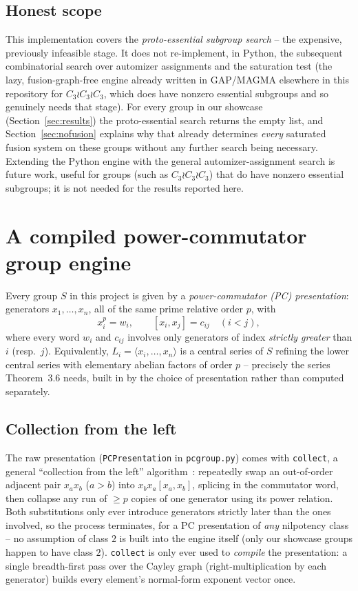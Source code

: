 \documentclass[11pt]{article}
\theoremstyle{remark}
\begin{document}
\subsection{Honest scope}
\label{sec:scope}

This implementation covers the \emph{proto-essential subgroup search} --
the expensive, previously infeasible stage. It does not re-implement, in
Python, the subsequent combinatorial search over automizer assignments and
the saturation test (the lazy, fusion-graph-free engine already written in
GAP/MAGMA elsewhere in this repository for $C_3 \wr C_3 \wr C_3$, which does
have nonzero essential subgroups and so genuinely needs that stage). For
every group in our showcase (Section~\ref{sec:results}) the proto-essential
search returns the empty list, and Section~\ref{sec:nofusion} explains why
that already determines \emph{every} saturated fusion system on these
groups without any further search being necessary. Extending the Python
engine with the general automizer-assignment search is future work, useful
for groups (such as $C_3 \wr C_3 \wr C_3$) that do have nonzero essential
subgroups; it is not needed for the results reported here.

\section{A compiled power-commutator group engine}
\label{sec:engine}

Every group $S$ in this project is given by a \emph{power-commutator (PC)
presentation}: generators $x_1,\dots,x_n$, all of the same prime relative
order $p$, with
\[
  x_i^p = w_i, \qquad [x_i,x_j] = c_{ij} \quad (i<j),
\]
where every word $w_i$ and $c_{ij}$ involves only generators of index
\emph{strictly greater} than $i$ (resp.\ $j$). Equivalently, $L_i =
\langle x_i,\dots,x_n\rangle$ is a central series of $S$ refining the lower
central series with elementary abelian factors of order $p$ -- precisely the
series Theorem~3.6 needs, built in by the choice of presentation rather than
computed separately.

\subsection{Collection from the left}

The raw presentation (\texttt{PCPresentation} in \texttt{pcgroup.py}) comes
with \texttt{collect}, a general ``collection from the left''
algorithm~\cite[Ch.~9]{sims1994}: repeatedly swap an out-of-order adjacent
pair $x_a x_b$ ($a>b$) into $x_b x_a [x_a,x_b]$, splicing in the commutator
word, then collapse any run of $\ge p$ copies of one generator using its
power relation. Both substitutions only ever introduce generators strictly
later than the ones involved, so the process terminates, for a PC
presentation of \emph{any} nilpotency class -- no assumption of class $2$ is
built into the engine itself (only our showcase groups happen to have class
$2$). \texttt{collect} is only ever used to \emph{compile} the presentation:
a single breadth-first pass over the Cayley graph (right-multiplication by
each generator) builds every element's normal-form exponent vector once.
\end{document}
